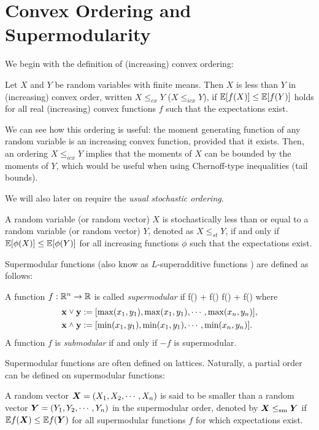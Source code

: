 \section{Convex Ordering and Supermodularity}
\label{sec:supermodular}

We begin with the definition of (increasing) convex ordering:
\begin{defn}
Let $X$ and $Y$ be
random variables with finite means. Then $X$ is
less than $Y$ in (increasing) convex order, written $X \le_{cx} Y$
($X \le_{icx} Y$), if $\mathbb E[f(X)] \le \mathbb E[f(Y)]$ holds for all real
(increasing) convex functions $f$ such that the expectations
exist.
\label{def:convex_order}
\end{defn}

We can see how this ordering is useful: the moment generating function of any
random variable is an increasing convex function, provided that it exists. Then,
an ordering $X \le_{icx} Y$ implies that the moments of $X$ can be bounded by the
moments of $Y$, which would be useful when using Chernoff-type inequalities (tail
bounds).

We will also later on require the \textit{usual stochastic ordering}.
\begin{defn}
A random variable (or random vector) $X$ is stochastically less than or equal to a random 
variable (or random vector) $Y$, denoted as $X \le_{st} Y$, if and only if $\mathbb E[\phi(X)]
\le \mathbb E[\phi(Y)]$ for all increasing functions $\phi$ such that the expectations exist.
\label{defn:st_order}
\end{defn}

Supermodular functions (also know as $L$-superadditive functions \cite{Block89Ladditive}) are defined as follows:
\begin{defn}
A function $f: \mathbb R^n \to \mathbb R$ is called \textit{supermodular} if 
\ben
f(\bx \join \by) + f(\bx \meet \by) \ge f(\bx) + f(\by)
\een
where
\begin{align*}
\bx \join \by &:= \lbrack \max(x_1,y_1), \max(x_1,y_1), \cdots, \max(x_n,y_n)\rbrack,\\
\bx \meet \by &:= \lbrack \min(x_1,y_1), \min(x_1,y_1), \cdots, \min(x_n,y_n)\rbrack.
\end{align*}
A function $f$ is \textit{submodular} if and only if $-f$ is supermodular.
\end{defn}

Supermodular functions are often defined on lattices. Naturally, a partial order can be
defined on supermodular functions:
\begin{defn}
A random vector $\boldsymbol{X} = (X_1,X_2,\cdots,X_n)$ is said to be smaller than a random vector
$\boldsymbol{Y} = (Y_1,Y_2,\cdots,Y_n)$ in the supermodular order, denoted by $\boldsymbol{X} \le_{\text{sm}} \boldsymbol{Y}$ if
$\mathbb E f(\boldsymbol{X}) \le \mathbb E f(\boldsymbol{Y})$ for all supermodular functions $f$ for which expectations exist. 
\end{defn}

